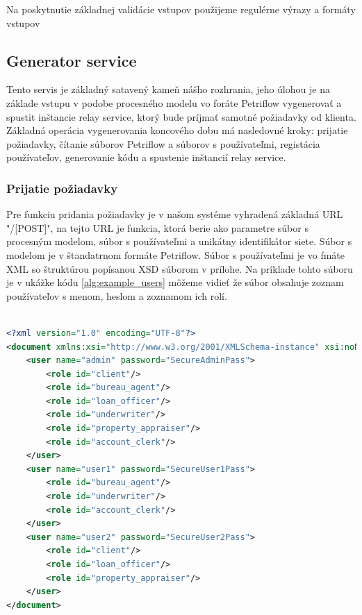 Na poskytnutie základnej validácie vstupov použijeme regulérne výrazy a formáty vstupov


  

\subsection{Generator service} 
Tento servis je základný satavený kameň nášho rozhrania, jeho úlohou je na základe vstupu v podobe procesného modelu vo foráte Petriflow vygenerovať a spustit inštancie relay service, ktorý bude príjmať samotné požiadavky od klienta. Základná operácia vygenerovania koncového dobu má nasledovné kroky: 
prijatie požiadavky, 
čítanie súborov Petriflow a súborov s používateľmi, 
registácia používateľov,
generovanie kódu 
a spustenie inštancií relay service.

\subsubsection{Prijatie požiadavky}
Pre funkciu pridania požiadavky je v našom systéme vyhradená základná URL "/[POST]", na tejto URL je funkcia, ktorá berie ako parametre súbor s procesným modelom, súbor s používateľmi a unikátny identifikátor siete. Súbor s modelom je v štandatrnom formáte Petriflow. Súbor s používateľmi je vo fmáte XML so štruktúrou popísanou XSD súborom v prílohe. Na príklade tohto súboru je v ukážke kódu \ref{alg:example_users} môžeme vidieť že súbor obsahuje zoznam používateľov s menom, heslom a zoznamom ich rolí.  




\begin{lstlisting}[caption={Príklad súboru s používateľmi},label={alg:example_users},language=XML]

<?xml version="1.0" encoding="UTF-8"?>
<document xmlns:xsi="http://www.w3.org/2001/XMLSchema-instance" xsi:noNamespaceSchemaLocation="./users_schema.xsd">
	<user name="admin" password="SecureAdminPass">
		<role id="client"/>
		<role id="bureau_agent"/>
		<role id="loan_officer"/>
		<role id="underwriter"/>
		<role id="property_appraiser"/>
		<role id="account_clerk"/>
	</user>
	<user name="user1" password="SecureUser1Pass">
		<role id="bureau_agent"/>
		<role id="underwriter"/>
		<role id="account_clerk"/>
	</user>
	<user name="user2" password="SecureUser2Pass">
		<role id="client"/>
		<role id="loan_officer"/>
		<role id="property_appraiser"/>
	</user>
</document>
\end{lstlisting}


